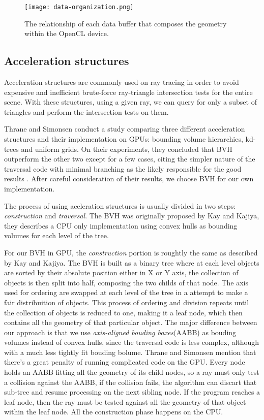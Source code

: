 \documentclass{vgtc}
\begin{document}
\begin{figure}
\centering
\texttt{[image: data-organization.png]}
\caption{The relationship of each data buffer that composes the
  geometry within the OpenCL device.}
\label{fig:data-org}
\end{figure}


\subsection{Acceleration structures}

Acceleration structures are commonly used on ray tracing in order to
avoid expensive and inefficient brute-force ray-triangle intersection
tests for the entire scene. With these structures, using a given ray,
we can query for only a subset of triangles and perform the
intersection tests on them.

Thrane and Simonsen conduct a study comparing three different
acceleration structures and their implementation on GPUs: bounding
volume hierarchies, kd-trees and uniform grids. On their experiments,
they concluded that BVH outperform the other two except for a few
cases, citing the simpler nature of the traversal code with minimal
branching as the likely responsible for the good results
\cite{Thrane}. After careful consideration of their results, we choose
BVH for our own implementation.

The process of using aceleration structures is usually divided in two
steps: \emph{construction} and \emph{traversal}. The BVH was
originally proposed by Kay and Kajiya\cite{kay1986ray}, they describes
a CPU only implementation using convex hulls as bounding volumes for
each level of the tree.

For our BVH in GPU, the \emph{construction} portion is roughtly the
same as described by Kay and Kajiya. The BVH is built as a binary tree
where at each level objects are sorted by their absolute position
either in X or Y axis, the collection of objects is then split into
half, composing the two childs of that node. The axis used for
ordering are swapped at each level of the tree in a attempt to make a
fair distribuition of objects. This process of ordering and division
repeats until the collection of objects is reduced to one, making it a
leaf node, which then contains all the geometry of that particular
object. The major difference between our approach is that we use
\emph{axis-aligned bouding boxes}(AABB) as bouding volumes instead of
convex hulls, since the traversal code is less complex, although with
a much less tightly fit bouding bolume. Thrane and Simonsen mention
that there's a great penalty of running complicated code on the
GPU\cite{Thrane}. Every node holds an AABB fitting all the geometry of
its child nodes, so a ray must only test a collision against the AABB,
if the collision fails, the algorithm can discart that sub-tree and
resume processing on the next sibling node. If the program reaches a
leaf node, then the ray must be tested against all the geometry of
that object within the leaf node. All the construction phase happens
on the CPU.
\end{document}
